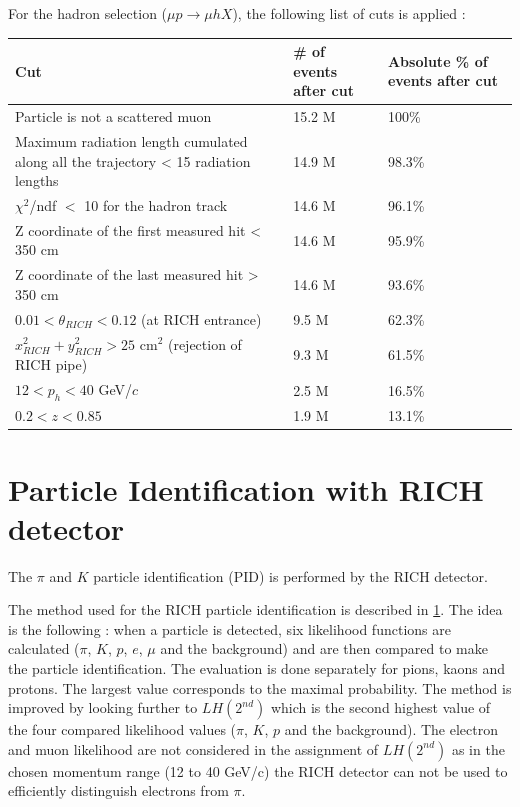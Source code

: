 For the hadron selection ($\mu p \rightarrow \mu hX$), the following list of cuts is applied :
\begin{table}[!h]
  \centering
  \begin{tabular}{p{10cm} p{2cm} p{2cm}}
    \hline
    \hline
     Cut & \# of events after cut & Absolute \% of events after cut  \\
    \hline
    \hline
    Particle is not a scattered muon & 15.2 M & 100\% \\
    Maximum radiation length cumulated along all the trajectory < 15 radiation lengths & 14.9 M & 98.3\% \\
    $\chi^2$/ndf $<$ 10 for the hadron track & 14.6 M & 96.1\% \\
    Z coordinate of the first measured hit < 350 cm & 14.6 M & 95.9\% \\
    Z coordinate of the last measured hit > 350 cm & 14.6 M & 93.6\% \\
    $0.01 < \theta_{RICH} < 0.12$ (at RICH entrance) & 9.5 M & 62.3\% \\
    $x^2_{RICH} + y^2_{RICH} > 25$ cm$^2$ (rejection of RICH pipe) & 9.3 M & 61.5\% \\
    $12 < p_h < 40$ GeV/$c$ & 2.5 M & 16.5\% \\
    $0.2 < z < 0.85$ & 1.9 M & 13.1\% \\
    \hline
    \hline
  \end{tabular}
\end{table}


\section{Particle Identification with RICH detector}

The $\pi$ and $K$ particle identification (PID) is performed by the RICH detector.

The method used for the RICH particle identification is described in \ref{}. The idea is the following : when a particle is detected, six likelihood functions are calculated ($\pi$, $K$, $p$, $e$, $\mu$ and the background) and are then compared to make the particle identification. The evaluation is done separately for pions, kaons and protons. The largest value corresponds to the maximal probability. The method is improved by looking further to $LH(2^{nd})$ which is the second highest value of the four compared likelihood values ($\pi$, $K$, $p$ and the background). The electron and muon likelihood are not considered in the assignment of $LH(2^{nd})$ as in the chosen momentum range (12 to 40 GeV/c) the RICH detector can not be used to efficiently distinguish electrons from $\pi$.

